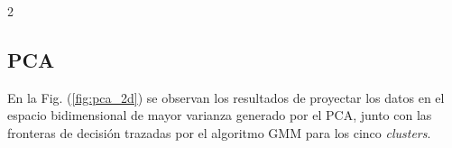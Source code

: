 \documentclass[11pt, letterpaper]{article}
\begin{document}
\begin{multicols*}{2}
\subsection{PCA}

En la Fig. (\ref{fig:pca_2d}) se observan los resultados de proyectar los datos en el espacio bidimensional de mayor varianza generado por el PCA, junto con las fronteras de decisión trazadas por el algoritmo GMM para los cinco \textit{clusters}. %


\end{multicols*}
\end{document}
